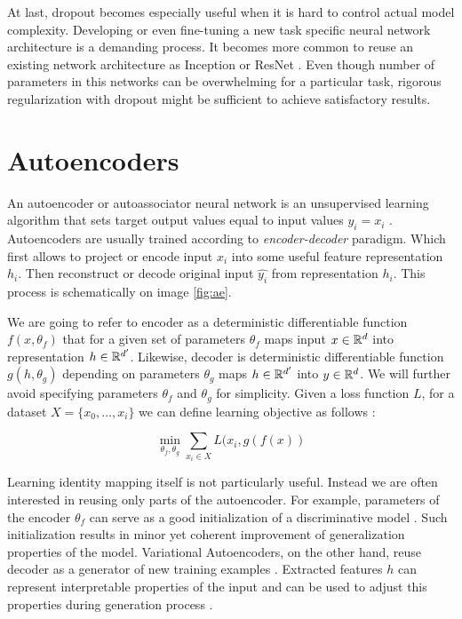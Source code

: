 At last, dropout becomes especially useful when it is hard to control actual model complexity. Developing or even fine-tuning a new task specific neural network architecture is a demanding process. It becomes more common to reuse an existing network architecture as Inception or ResNet \cite{He2015, Szegedy2016}. Even though number of parameters in this networks can be overwhelming for a particular task, rigorous regularization with dropout might be sufficient to achieve satisfactory results.


\section{Autoencoders}\label{ch:ae}
An autoencoder or autoassociator neural network is an unsupervised learning algorithm that sets target output values equal to input values $y_i=x_i$ \cite{Ng2011,RanzatoMarcAurelio2007}.
Autoencoders are usually trained according to \textit{encoder-decoder} paradigm.
Which first allows to project or encode input $x_i$ into some useful feature representation $h_i$.
Then reconstruct or decode original input $\hat{y_i}$ from representation $h_i$.
This process is schematically on image \ref{fig:ae}.





We are going to refer to encoder as a deterministic differentiable function $f(x, \theta_f)$ that for a given set of parameters $\theta_f$ maps input $x\in \Bbb{R}^d$ into representation $h \in \Bbb{R}^{d'}$.
Likewise, decoder is deterministic differentiable function $g(h, \theta_g)$ depending on parameters $\theta_g$ maps $h\in\Bbb{R}^{d'}$ into $y\in \Bbb{R}^d$. We will further avoid specifying parameters $\theta_f$ and $\theta_g$ for simplicity.
Given a loss function $L$, for a dataset $X=\{x_0, ..., x_i\}$ we can define learning objective as follows \cite{Good2016}:

\begin{equation}\label{eq:ae}
\min_{\theta_f, \theta_g}\sum\limits_{x_i \in X}{L(x_i, g(f(x))}
\end{equation}

Learning identity mapping itself is not particularly useful.
Instead we are often interested in reusing only parts of the autoencoder.
For example, parameters of the encoder $\theta_f$ can serve as a good initialization of a discriminative model \cite{Masci2011, Vincent2010, Zhao2015}.
Such initialization results in minor yet coherent improvement of generalization properties of the model.
Variational Autoencoders, on the other hand, reuse decoder as a generator of new training examples \cite{Kingma2013}.
Extracted features $h$ can represent interpretable properties of the input and can be used to adjust this
properties during generation process \cite{Kulkarni2015, Whitney2016}.

